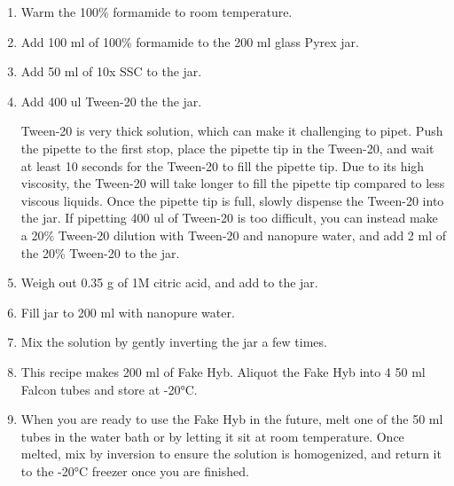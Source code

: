 \documentclass[
  letterpaper,
  DIV=11,
  numbers=noendperiod]{scrreprt}
\begin{document}
\begin{enumerate}
\def\labelenumi{\arabic{enumi}.}
\item
  Warm the 100\% formamide to room temperature.
\item
  Add 100 ml of 100\% formamide to the 200 ml glass Pyrex jar.
\item
  Add 50 ml of 10x SSC to the jar.
\item
  Add 400 ul Tween-20 the the jar.

  \begin{tcolorbox}[enhanced jigsaw, rightrule=.15mm, title=\textcolor{quarto-callout-important-color}{\faExclamation}\hspace{0.5em}{NOTE}, titlerule=0mm, opacitybacktitle=0.6, toprule=.15mm, bottomrule=.15mm, opacityback=0, left=2mm, colframe=quarto-callout-important-color-frame, breakable, coltitle=black, colback=white, colbacktitle=quarto-callout-important-color!10!white, bottomtitle=1mm, leftrule=.75mm, toptitle=1mm, arc=.35mm]

  Tween-20 is very thick solution, which can make it challenging to
  pipet. Push the pipette to the first stop, place the pipette tip in
  the Tween-20, and wait at least 10 seconds for the Tween-20 to fill
  the pipette tip. Due to its high viscosity, the Tween-20 will take
  longer to fill the pipette tip compared to less viscous liquids. Once
  the pipette tip is full, slowly dispense the Tween-20 into the jar. If
  pipetting 400 ul of Tween-20 is too difficult, you can instead make a
  20\% Tween-20 dilution with Tween-20 and nanopure water, and add 2 ml
  of the 20\% Tween-20 to the jar.

  \end{tcolorbox}
\item
  Weigh out 0.35 g of 1M citric acid, and add to the jar.
\item
  Fill jar to 200 ml with nanopure water.
\item
  Mix the solution by gently inverting the jar a few times.
\item
  This recipe makes 200 ml of Fake Hyb. Aliquot the Fake Hyb into 4 50
  ml Falcon tubes and store at -20°C.
\item
  When you are ready to use the Fake Hyb in the future, melt one of the
  50 ml tubes in the water bath or by letting it sit at room
  temperature. Once melted, mix by inversion to ensure the solution is
  homogenized, and return it to the -20°C freezer once you are finished.
\end{enumerate}
\end{document}
